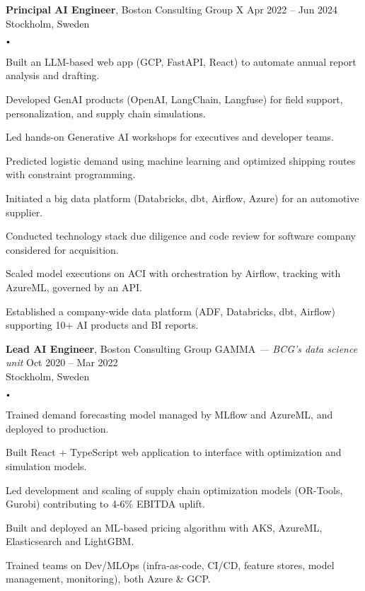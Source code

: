 \documentclass{article}
\newcommand{\experience}[5]{
    \vspace*{2pt}
    \textbf{#1}, #2 \hfill #3 \\ 
    #4 \\
    #5
    \vspace*{2pt}
}
\newcommand{\spacedbullet}{
    $\vcenter{\hbox{\tiny$\bullet$}}$\hspace*{-2pt}
}
\newenvironment{bulletlist}{
    \begin{list}
        {\spacedbullet}{\setlength\leftmargin{10pt} 
        \topsep 0pt \itemsep -2pt}}{\vspace*{4pt}
    \end{list}
}
\begin{document}
\experience{Principal AI Engineer}{Boston Consulting Group X}{Apr 2022 -- Jun 2024}{Stockholm, Sweden}
{
    \begin{bulletlist}
        \item Built an LLM-based web app (GCP, FastAPI, React) to automate annual report analysis and drafting.
        \item Developed GenAI products (OpenAI, LangChain, Langfuse) for field support, personalization, and supply chain simulations.
        \item Led hands-on Generative AI workshops for executives and developer teams.
        \item Predicted logistic demand using machine learning and optimized shipping routes with constraint programming.
        \item Initiated a big data platform (Databricks, dbt, Airflow, Azure) for an automotive supplier.
        \item Conducted technology stack due diligence and code review for software company considered for acquisition.
        \item Scaled model executions on ACI with orchestration by Airflow, tracking with AzureML, governed by an API.
        \item Established a company-wide data platform (ADF, Databricks, dbt, Airflow) supporting 10+ AI products and BI reports.
    \end{bulletlist}
}

\experience{Lead AI Engineer}{Boston Consulting Group GAMMA \textit{— BCG's data science unit}}{Oct 2020 -- Mar 2022}{Stockholm, Sweden}
{
    \begin{bulletlist}
        \item Trained demand forecasting model managed by MLflow and AzureML, and deployed to production.
        \item Built React + TypeScript web application to interface with optimization and simulation models.
        \item Led development and scaling of supply chain optimization models (OR-Tools, Gurobi) contributing to 4-6\% EBITDA uplift.
        \item Built and deployed an ML-based pricing algorithm with AKS, AzureML, Elasticsearch and LightGBM.
        \item Trained teams on Dev/MLOps (infra-as-code, CI/CD, feature stores, model management, monitoring), both Azure \& GCP.
    \end{bulletlist}
}
\end{document}
